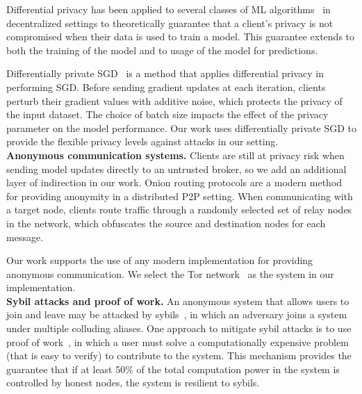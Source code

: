 Differential privacy has been applied to several classes of ML
algorithms~\cite{Shokri:2015, Bellet:2017} in decentralized settings to
theoretically guarantee that a client's privacy is not compromised when
their data is used to train a model. This guarantee extends to both the
training of the model and to usage of the model for predictions.

Differentially private SGD~\cite{Song:2013, Geyer:2017} is a method
that applies differential privacy in performing SGD. Before sending
gradient updates at each iteration, clients perturb their gradient
values with additive noise, which protects the privacy of the input
dataset. The choice of batch size impacts the effect of the privacy
parameter on the model performance. Our work uses differentially
private SGD to provide the flexible privacy levels against attacks in
our setting.\\

\noindent \textbf{Anonymous communication systems.}
Clients are still at privacy risk when sending model updates directly
to an untrusted broker, so we add an additional layer of indirection in
our work. Onion routing protocols are a modern method for providing
anonymity in a distributed P2P setting. When communicating with a
target node, clients route traffic through a randomly selected set of
relay nodes in the network, which obfuscates the source and destination
nodes for each message.

Our work supports the use of any modern implementation for providing
anonymous communication. We select the Tor 
network~\cite{Dingledine:2004} as the system in our implementation. \\

\noindent \textbf{Sybil attacks and proof of work.}
%
An anonymous system that allows users to join and leave may be attacked
by sybils~\cite{Douceur:2002}, in which an adversary joins a system
under multiple colluding aliases. One approach to mitigate sybil
attacks is to use proof of work~\cite{Back:2002}, in which a user must
solve a computationally expensive problem (that is easy to verify) to
contribute to the system. This mechanism provides the guarantee that if
at least 50\% of the total computation power in the system is
controlled by honest nodes, the system is resilient to sybils.

